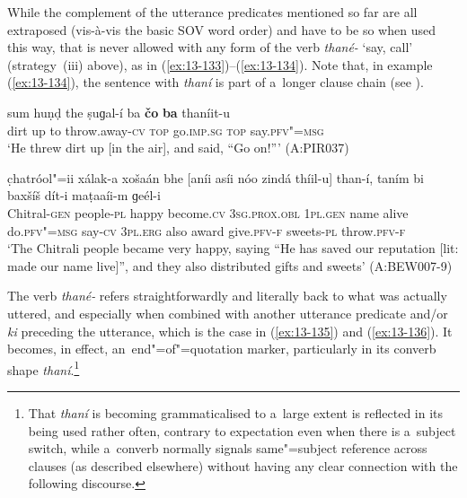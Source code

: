 While the complement of the utterance predicates mentioned so far are all extraposed (vis-à-vis the basic SOV word order) and have to be so when used this way, that is never allowed with any form of the verb \textit{thané-} `say, call' (strategy~(iii) above), as in (\ref{ex:13-133})--(\ref{ex:13-134}). Note that, in example (\ref{ex:13-134}), the sentence with \textit{thaní} is part of a~longer clause chain (see ).

\begin{exe}
\ex
\label{ex:13-133}
\gll sum huṇḍ the ṣuɡal-í ba \textbf{čo} \textbf{ba}  thaníit-u \\
dirt up to throw.away-\textsc{cv} \textsc{top} go.\textsc{imp.sg} \textsc{top} say.\textsc{pfv"=msg} \\
\glt `He threw dirt up [in the air], and said, ``Go on!''' (A:PIR037)

\ex
\label{ex:13-134}
\gll c̣hatróol"=ii xálak-a xošaán bhe  [aníi asíi nóo zindá thíil-u]
than-í,  taním bi baxšíš dít-i maṭaaíi-m   ɡeél-i \\
Chitral-\textsc{gen} people-\textsc{pl} happy become.\textsc{cv}  \textsc{3sg.prox.obl } \textsc{1pl.gen} name alive do.\textsc{pfv"=msg} say-\textsc{cv}  \textsc{3pl.erg} also award give.\textsc{pfv-f} sweets-\textsc{pl} throw.\textsc{pfv-f}  \\
\glt `The Chitrali people became very happy, saying ``He has saved our reputation [lit: made our name live]'', and they also distributed gifts and sweets' (A:BEW007-9) 
\end{exe}

The verb \textit{thané-} refers straightforwardly and literally back to what was actually uttered,
and especially when combined with another utterance predicate and/or \textit{ki} preceding the
utterance, which is the case in (\ref{ex:13-135}) and (\ref{ex:13-136}). It becomes, in effect,
an~end"=of"=quotation marker, particularly in its converb shape \textit{thaní}.\footnote{That
  \textit{thaní} is becoming grammaticalised to a~large extent is reflected in its being used rather
  often, contrary to expectation even when there is a~subject switch, while a~converb normally
  signals same"=subject reference across clauses (as described elsewhere) without having any clear
  connection with the following discourse.}

